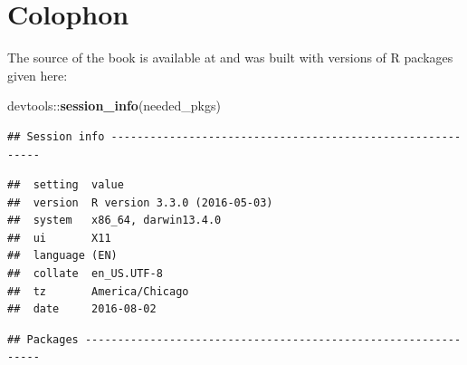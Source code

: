 \documentclass[]{tufte-book}
\newenvironment{Shaded}{\begin{snugshade}}{\end{snugshade}}
\newcommand{\KeywordTok}[1]{\textcolor[rgb]{0.13,0.29,0.53}{\textbf{{#1}}}}
\newcommand{\NormalTok}[1]{{#1}}
\begin{document}
\section{Colophon}\label{colophon}

The source of the book is available at and was built with versions of R
packages given here:

\begin{Shaded}
\begin{Highlighting}[]
\NormalTok{devtools::}\KeywordTok{session_info}\NormalTok{(needed_pkgs)}
\end{Highlighting}
\end{Shaded}

\begin{verbatim}
## Session info -----------------------------------------------------------
\end{verbatim}

\begin{verbatim}
##  setting  value                       
##  version  R version 3.3.0 (2016-05-03)
##  system   x86_64, darwin13.4.0        
##  ui       X11                         
##  language (EN)                        
##  collate  en_US.UTF-8                 
##  tz       America/Chicago             
##  date     2016-08-02
\end{verbatim}

\begin{verbatim}
## Packages ---------------------------------------------------------------
\end{verbatim}
\end{document}

